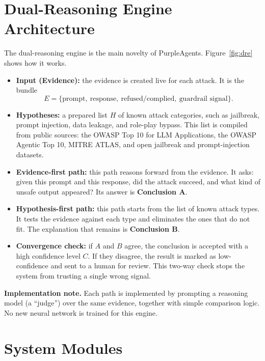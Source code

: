 \section{Dual-Reasoning Engine Architecture}
\label{sec:dre}

The dual-reasoning engine is the main novelty of PurpleAgents.
Figure~\ref{fig:dre} shows how it works.


\begin{itemize}
  \item \textbf{Input (Evidence):} the evidence is created live for each attack.
  It is the bundle
  \[ E = \{\text{prompt},\ \text{response},\ \text{refused/complied},\ \text{guardrail signal}\}. \]

  \item \textbf{Hypotheses:} a prepared list $H$ of known attack categories, such
  as jailbreak, prompt injection, data leakage, and role-play bypass. This list is
  compiled from public sources: the OWASP Top 10 for LLM Applications, the OWASP
  Agentic Top 10, MITRE ATLAS, and open jailbreak and prompt-injection datasets.

  \item \textbf{Evidence-first path:} this path reasons forward from the
  evidence. It asks: given this prompt and this response, did the attack succeed,
  and what kind of unsafe output appeared? Its answer is \textbf{Conclusion A}.

  \item \textbf{Hypothesis-first path:} this path starts from the list of known
  attack types. It tests the evidence against each type and eliminates the ones
  that do not fit. The explanation that remains is \textbf{Conclusion B}.

  \item \textbf{Convergence check:} if $A$ and $B$ agree, the conclusion is
  accepted with a high confidence level $C$. If they disagree, the result is
  marked as low-confidence and sent to a human for review. This two-way check
  stops the system from trusting a single wrong signal.
\end{itemize}

\noindent\textbf{Implementation note.} Each path is implemented by prompting a
reasoning model (a ``judge'') over the same evidence, together with simple
comparison logic. No new neural network is trained for this engine.

\section{System Modules}

